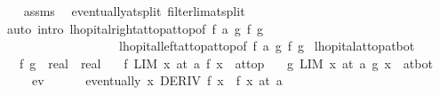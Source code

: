 \begin{isabellebody}
%
\isadelimproof
\ \ %
\endisadelimproof
%
\isatagproof
{}\isamarkupfalse%
\ assms\ \isamarkupfalse%
\ eventually{\isacharunderscore}{\kern0pt}at{\isacharunderscore}{\kern0pt}split\ filterlim{\isacharunderscore}{\kern0pt}at{\isacharunderscore}{\kern0pt}split\isanewline
\ \ \isamarkupfalse%
\ {\isacharparenleft}{\kern0pt}auto\ intro{\isacharbang}{\kern0pt}{\isacharcolon}{\kern0pt}\ lhopital{\isacharunderscore}{\kern0pt}right{\isacharunderscore}{\kern0pt}at{\isacharunderscore}{\kern0pt}top{\isacharunderscore}{\kern0pt}at{\isacharunderscore}{\kern0pt}top{\isacharbrackleft}{\kern0pt}of\ f\ a\ g\ f{\isacharprime}{\kern0pt}\ g{\isacharprime}{\kern0pt}{\isacharbrackright}{\kern0pt}\ \isanewline
\ \ \ \ \ \ \ \ \ \ \ \ \ \ \ \ \ \ \ lhopital{\isacharunderscore}{\kern0pt}left{\isacharunderscore}{\kern0pt}at{\isacharunderscore}{\kern0pt}top{\isacharunderscore}{\kern0pt}at{\isacharunderscore}{\kern0pt}top{\isacharbrackleft}{\kern0pt}of\ f\ a\ g\ f{\isacharprime}{\kern0pt}\ g{\isacharprime}{\kern0pt}{\isacharbrackright}{\kern0pt}{\isacharparenright}{\kern0pt}%
\endisatagproof
{\isafoldproof}%
%
\isadelimproof
\isanewline
%
\endisadelimproof
\isanewline
{}\isamarkupfalse%
\ lhopital{\isacharunderscore}{\kern0pt}at{\isacharunderscore}{\kern0pt}top{\isacharunderscore}{\kern0pt}at{\isacharunderscore}{\kern0pt}bot{\isacharcolon}{\kern0pt}\isanewline
\ \ \ f\ g\ {\isacharcolon}{\kern0pt}{\isacharcolon}{\kern0pt}\ {\isachardoublequoteopen}real\ {\isasymRightarrow}\ real{\isachardoublequoteclose}\isanewline
\ \ \ f{\isacharunderscore}{\kern0pt}{}{\isacharcolon}{\kern0pt}\ {\isachardoublequoteopen}LIM\ x\ at\ a{\isachardot}{\kern0pt}\ f\ x\ {\isacharcolon}{\kern0pt}{\isachargreater}{\kern0pt}\ at{\isacharunderscore}{\kern0pt}top{\isachardoublequoteclose}\isanewline
\ \ \ g{\isacharunderscore}{\kern0pt}{}{\isacharcolon}{\kern0pt}\ {\isachardoublequoteopen}LIM\ x\ at\ a{\isachardot}{\kern0pt}\ g\ x\ {\isacharcolon}{\kern0pt}{\isachargreater}{\kern0pt}\ at{\isacharunderscore}{\kern0pt}bot{\isachardoublequoteclose}\isanewline
\ \ \ \ \ ev{\isacharcolon}{\kern0pt}\isanewline
\ \ \ \ \ \ {\isachardoublequoteopen}eventually\ {\isacharparenleft}{\kern0pt}{\isasymlambda}x{\isachardot}{\kern0pt}\ DERIV\ f\ x\ {\isacharcolon}{\kern0pt}{\isachargreater}{\kern0pt}\ f{\isacharprime}{\kern0pt}\ x{\isacharparenright}{\kern0pt}\ {\isacharparenleft}{\kern0pt}at\ a{\isacharparenright}{\kern0pt}{\isachardoublequoteclose}\isanewline

\end{isabellebody}
